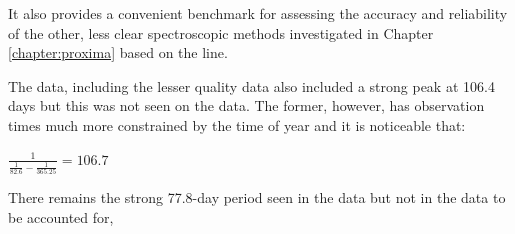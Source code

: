 It also provides a convenient benchmark for assessing the accuracy and reliability of the other, less clear
spectroscopic methods investigated in Chapter \ref{chapter:proxima} based on the {\ha} line.

The {\asas} data, including the lesser quality data also included a strong peak at 106.4 days but this was not seen on
the {\hst} data. The former, however, has observation times much more constrained by the time of year and it is
noticeable that:

\begin{center}

$ \frac{1}{\frac{1}{82.6} - \frac{1}{365.25}} = 106.7 $

\end{center}

There remains the strong 77.8-day period seen in the {\hst} data but not in the {\asas} data to be accounted for,

